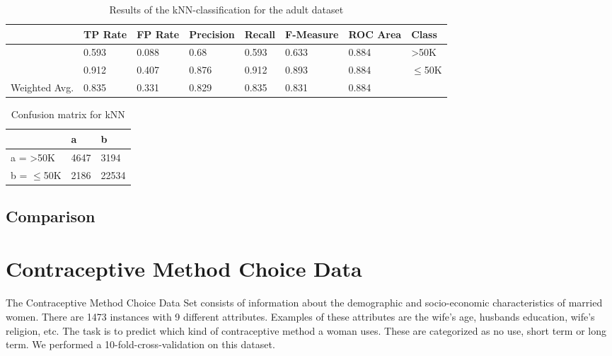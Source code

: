 \documentclass[paper=a4, fontsize=11pt]{scrartcl} %
\numberwithin{equation}{section} %
\numberwithin{figure}{section} %
\numberwithin{table}{section} %
\begin{document}
\begin{table}[h]
\centering
\begin{tabular}{|llllllll|}
	\hline
									&TP Rate   &FP Rate   &Precision   &Recall  &F-Measure &ROC Area  	&Class\\
	\hline
									&0.593     &0.088      &0.68      &0.593     &0.633    &0.884    		&>50K\\
									&0.912     &0.407      &0.876     &0.912     &0.893    &0.884    		&$\leq$50K\\
  \hline
	Weighted Avg.   &0.835     &0.331      &0.829     &0.835     &0.831    &0.884 \\
	\hline
\end{tabular}
\caption{Results of the kNN-classification for the adult dataset}
\end{table}

\vspace{6pt}

\begin{table}[h]
\centering
\begin{tabular}{|l|ll|}
	\hline
	 &              a    & b     \\
	\hline
    a = >50K      &	4647 & 3194  \\
    b = $\leq$50K & 2186 & 22534 \\
    \hline
\end{tabular}
\caption{Confusion matrix for kNN}
\end{table}


\subsection{Comparison}






\section{Contraceptive Method Choice Data}

\paragraph{}The Contraceptive Method Choice Data Set consists of information about the demographic and socio-economic characteristics of married women. There are 1473 instances with 9 different attributes. Examples of these attributes are the wife's age, husbands education, wife's religion, etc. The task is to predict which kind of contraceptive method a woman uses. These are categorized as no use, short term or long term. We performed a 10-fold-cross-validation on this dataset.
\end{document}
